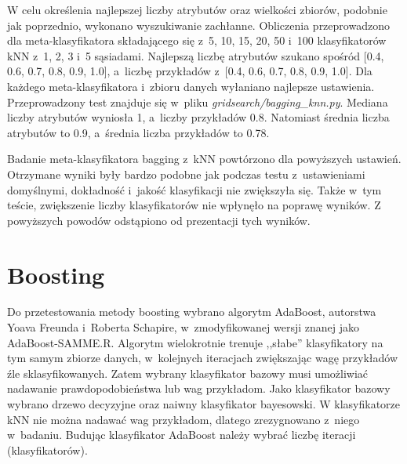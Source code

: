 W celu określenia najlepszej liczby atrybutów oraz wielkości zbiorów, podobnie jak poprzednio, wykonano wyszukiwanie zachłanne. Obliczenia przeprowadzono dla meta-klasyfikatora składającego się z~5, 10, 15, 20, 50 i~100 klasyfikatorów kNN z~1, 2, 3 i~5 sąsiadami. Najlepszą liczbę atrybutów szukano spośród [0.4, 0.6, 0.7, 0.8, 0.9, 1.0], a~liczbę przykładów z~[0.4, 0.6, 0.7, 0.8, 0.9, 1.0]. Dla każdego meta-klasyfikatora i~zbioru danych wyłaniano najlepsze ustawienia. Przeprowadzony test znajduje się w~pliku \textit{gridsearch/bagging\_knn.py}. Mediana liczby atrybutów wyniosła 1, a~liczby przykładów 0.8. Natomiast średnia liczba atrybutów to 0.9, a~średnia liczba przykładów to 0.78. \par
Badanie meta-klasyfikatora bagging z~kNN powtórzono dla powyższych ustawień. Otrzymane wyniki były bardzo podobne jak podczas testu z~ustawieniami domyślnymi, dokładność i~jakość klasyfikacji nie zwiększyła się. Także w~tym teście, zwiększenie liczby klasyfikatorów nie wpłynęło na poprawę wyników. Z powyższych powodów odstąpiono od prezentacji tych wyników.



\section{Boosting}
Do przetestowania metody boosting wybrano algorytm AdaBoost, autorstwa Yoava Freunda i~Roberta Schapire, w~zmodyfikowanej wersji znanej jako AdaBoost-SAMME.R. Algorytm wielokrotnie trenuje ,,słabe'' klasyfikatory na tym samym zbiorze danych, w~kolejnych iteracjach zwiększając wagę przykładów źle sklasyfikowanych. Zatem wybrany klasyfikator bazowy musi umożliwiać nadawanie prawdopodobieństwa lub wag przykładom. Jako klasyfikator bazowy wybrano drzewo decyzyjne oraz naiwny klasyfikator bayesowski. W klasyfikatorze kNN nie można nadawać wag przykładom, dlatego zrezygnowano z~niego w~badaniu. Budując klasyfikator AdaBoost należy wybrać liczbę iteracji (klasyfikatorów).

